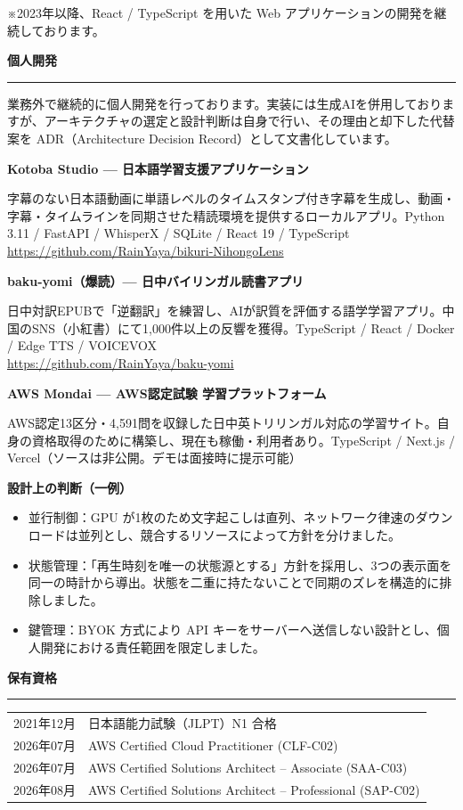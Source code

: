 \documentclass[paper=a4paper,fontsize=10pt,head_space=18mm,foot_space=15mm,gutter=15mm,fore_edge=15mm,baselineskip=16pt]{jlreq}
\newcommand{\kyariku}[1]{%
  \par\vspace{10pt}%
  {\Large\bfseries #1}\par\vspace{4pt}%
  {\color{gray}\rule{\textwidth}{0.4pt}}\par\vspace{6pt}%
}
\begin{document}
※2023年以降、React / TypeScript を用いた Web アプリケーションの開発を継続しております。

\kyariku{個人開発}

業務外で継続的に個人開発を行っております。実装には生成AIを併用しておりますが、アーキテクチャの選定と設計判断は自身で行い、その理由と却下した代替案を ADR（Architecture Decision Record）として文書化しています。

\textbf{Kotoba Studio — 日本語学習支援アプリケーション}\par
字幕のない日本語動画に単語レベルのタイムスタンプ付き字幕を生成し、動画・字幕・タイムラインを同期させた精読環境を提供するローカルアプリ。Python 3.11 / FastAPI / WhisperX / SQLite / React 19 / TypeScript\\
\url{https://github.com/RainYaya/bikuri-NihongoLens}

\textbf{baku-yomi（爆読）— 日中バイリンガル読書アプリ}\par
日中対訳EPUBで「逆翻訳」を練習し、AIが訳質を評価する語学学習アプリ。中国のSNS（小紅書）にて1,000件以上の反響を獲得。TypeScript / React / Docker / Edge TTS / VOICEVOX\\
\url{https://github.com/RainYaya/baku-yomi}

\textbf{AWS Mondai — AWS認定試験 学習プラットフォーム}\par
AWS認定13区分・4,591問を収録した日中英トリリンガル対応の学習サイト。自身の資格取得のために構築し、現在も稼働・利用者あり。TypeScript / Next.js / Vercel（ソースは非公開。デモは面接時に提示可能）

\textbf{設計上の判断（一例）}
\begin{itemize}
  \item 並行制御：GPU が1枚のため文字起こしは直列、ネットワーク律速のダウンロードは並列とし、競合するリソースによって方針を分けました。
  \item 状態管理：「再生時刻を唯一の状態源とする」方針を採用し、3つの表示面を同一の時計から導出。状態を二重に持たないことで同期のズレを構造的に排除しました。
  \item 鍵管理：BYOK 方式により API キーをサーバーへ送信しない設計とし、個人開発における責任範囲を限定しました。
\end{itemize}

\kyariku{保有資格}

\begin{tabular}{@{}p{6em}p{\dimexpr\textwidth-6em\relax}@{}}
  2021年12月 & 日本語能力試験（JLPT）N1 合格 \\
  2026年07月 & AWS Certified Cloud Practitioner (CLF-C02) \\
  2026年07月 & AWS Certified Solutions Architect -- Associate (SAA-C03) \\
  2026年08月 & AWS Certified Solutions Architect -- Professional (SAP-C02) \\
\end{tabular}
\end{document}
